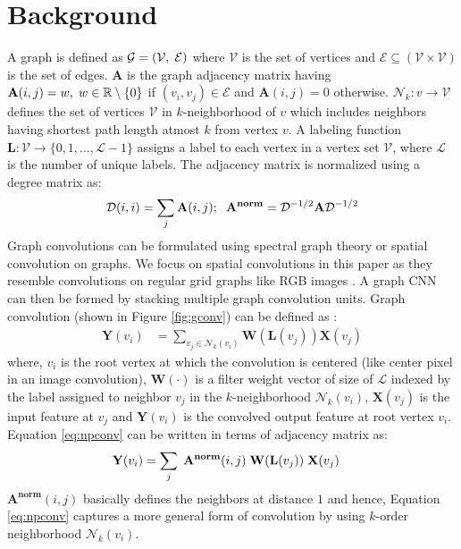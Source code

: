 \documentclass{bmvc2k}
\begin{document}
\section{Background}
\label{sec:background}
A graph is defined as $\mathcal{G} = (\mathcal{V}, \hspace{0.1cm} \mathcal{E})$ where $\mathcal{V}$ is the set of vertices and $\mathcal{E} \subseteq (\mathcal{V} \times \mathcal{V})$ is the set of edges. $\mathbf{A}$ is the graph adjacency matrix having $\mathbf{A}(i,j) = w, \hspace{0.1cm} w \in \mathbb{R} \setminus \{0\}$ if $(v_i, v_j) \in \mathcal{E}$ and $\mathbf{A}(i,j) = 0$ otherwise. $\mathcal{N}_k: v \rightarrow \mathcal{V}$ defines the set of vertices $\mathcal{V}$ in $k$-neighborhood of $v$ which includes neighbors having shortest path length atmost $k$ from vertex $v$. A labeling function $\mathbf{L}: \mathcal{V} \rightarrow \{0,1,\ldots,\mathcal{L}-1\}$ assigns a label to each vertex in a vertex set $\mathcal{V}$, where $\mathcal{L}$ is the number of unique labels. The adjacency matrix is normalized using a degree matrix as:
\begingroup
\small
\begin{align}
    \mathcal{D}(i,i) = \sum_{j} \mathbf{A}(i,j); \hspace{0.2cm} \mathbf{A}^{\mathbf{norm}} = \mathcal{D}^{-1/2}\mathbf{A}\mathcal{D}^{-1/2} \label{eq:normadj}
\end{align}
\endgroup
Graph convolutions can be formulated using spectral graph theory \cite{defferrard2016convolutional} or spatial convolution \cite{niepert2016learning} on graphs. We focus on spatial convolutions in this paper as they resemble convolutions on regular grid graphs like RGB images \cite{niepert2016learning}. A graph CNN can then be formed by stacking multiple graph convolution units. Graph convolution (shown in Figure \ref{fig:gconv}) can be defined as \cite{niepert2016learning}:
\begingroup
\small
\begin{align}
    \mathbf{Y}(v_i) &= \sum_{v_j \in \mathcal{N}_k(v_i)} \mathbf{W}(\mathbf{L}(v_j)) \mathbf{X}(v_j) \label{eq:npconv}
\end{align}
\endgroup
where, $v_i$ is the root vertex at which the convolution is centered (like center pixel in an image convolution), $\mathbf{W}(\cdot)$ is a filter weight vector of size of $\mathcal{L}$ indexed by the label assigned to neighbor $v_j$ in the $k$-neighborhood $\mathcal{N}_k(v_i)$, $\mathbf{X}(v_j)$ is the input feature at $v_j$ and $\mathbf{Y}(v_i)$ is the convolved output feature at root vertex $v_i$. Equation \ref{eq:npconv} can be written in terms of adjacency matrix as:
\begingroup
\small
\begin{align}
    \mathbf{Y}(v_i) &= \sum_{j} \hspace{0.1cm} \mathbf{A}^{\mathbf{norm}}(i,j) \hspace{0.1cm} \mathbf{W}(\mathbf{L}(v_j)) \hspace{0.1cm} \mathbf{X}(v_j) \label{eq:npconvadj}
\end{align}
\endgroup
$\mathbf{A}^{\mathbf{norm}}(i,j)$ basically defines the neighbors at distance $1$ and hence, Equation \ref{eq:npconv} captures a more general form of convolution by using $k$-order neighborhood $\mathcal{N}_k(v_i)$.
\end{document}
